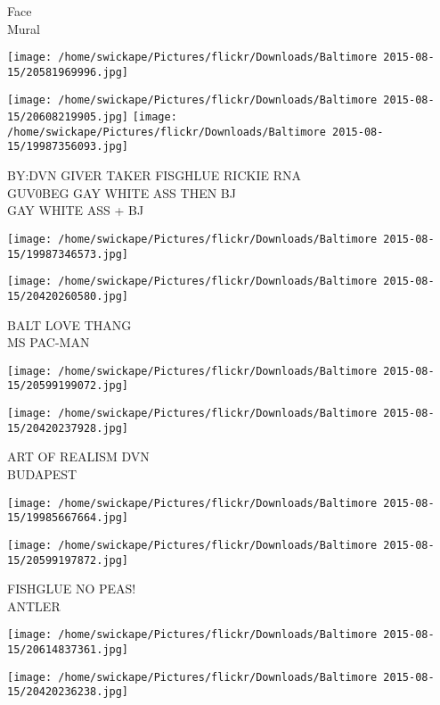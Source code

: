 \documentclass[10pt,letterpaper]{article}
\begin{document}
Face\\
Mural
\pagebreak

\texttt{[image: /home/swickape/Pictures/flickr/Downloads/Baltimore 2015-08-15/20581969996.jpg]}

\vspace{0.25in}
\texttt{[image: /home/swickape/Pictures/flickr/Downloads/Baltimore 2015-08-15/20608219905.jpg]}
\texttt{[image: /home/swickape/Pictures/flickr/Downloads/Baltimore 2015-08-15/19987356093.jpg]}

BY:DVN GIVER TAKER FISGHLUE RICKIE RNA\\
GUV0BEG GAY WHITE ASS THEN BJ\\
GAY WHITE ASS + BJ
\pagebreak

\texttt{[image: /home/swickape/Pictures/flickr/Downloads/Baltimore 2015-08-15/19987346573.jpg]}

\vspace{0.25in}
\texttt{[image: /home/swickape/Pictures/flickr/Downloads/Baltimore 2015-08-15/20420260580.jpg]}

BALT LOVE THANG\\
MS PAC{-}MAN
\pagebreak

\texttt{[image: /home/swickape/Pictures/flickr/Downloads/Baltimore 2015-08-15/20599199072.jpg]}

\vspace{0.25in}
\texttt{[image: /home/swickape/Pictures/flickr/Downloads/Baltimore 2015-08-15/20420237928.jpg]}

ART OF REALISM DVN\\
BUDAPEST
\pagebreak

\texttt{[image: /home/swickape/Pictures/flickr/Downloads/Baltimore 2015-08-15/19985667664.jpg]}

\vspace{0.25in}
\texttt{[image: /home/swickape/Pictures/flickr/Downloads/Baltimore 2015-08-15/20599197872.jpg]}

FISHGLUE NO PEAS!\\
ANTLER
\pagebreak

\texttt{[image: /home/swickape/Pictures/flickr/Downloads/Baltimore 2015-08-15/20614837361.jpg]}

\vspace{0.25in}
\texttt{[image: /home/swickape/Pictures/flickr/Downloads/Baltimore 2015-08-15/20420236238.jpg]}
\end{document}
